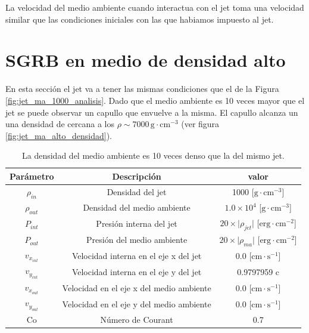 \documentclass[12pt,a4paper]{book}
\begin{document}
La velocidad del medio ambiente cuando interactua con el jet toma una velocidad similar que las condiciones iniciales con las que habiamos impuesto al jet.


\section{SGRB en medio de densidad alto}\label{sec:SGRB_en_medio_de_densidad_alto}
En esta sección el jet va a tener las mismas condiciones que el de la Figura \ref{fig:jet_ma_1000_analisis}. Dado que el medio ambiente es 10 veces mayor que el jet se puede observar un capullo que envuelve a la misma. El capullo alcanza un una densidad de cercana a los $\rho \sim 7000 \, \mathrm{g} \cdot \mathrm{cm}^{-3}$ (ver figura \ref{fig:jet_ma_alto_densidad}).

\begin{table}[htbp]
\begin{center}
\begin{tabular}{|c|c|c|}
\hline 
\textbf{Parámetro} & \textbf{Descripción} & \textbf{valor} \\ 
\hline 
$\rho_{in}$ &  Densidad del jet & 1000 [$\mathrm{g} \cdot \mathrm{cm}^{-3}$] \\ 
\hline 
$\rho_{out}$ &  Densidad del medio ambiente & $1.0 \times 10^{4}$  [$\mathrm{g} \cdot \mathrm{cm}^{-3}$] \\
\hline 
$P_{int}$ & Presión interna del jet& $20 \times \lvert \rho_{jet} \lvert$ [$ \mathrm{erg}\cdot \mathrm{cm}^{-2}$]\\ 
\hline 
$P_{out}$ &  Presión del medio ambiente & $20 \times \lvert \rho_{ma} \lvert$ [$\mathrm{erg}\cdot \mathrm{cm}^{-2}$] \\ 
\hline 
$v_{x_{int}}$ & Velocidad interna en el eje x del jet & 0.0 [$\mathrm{cm}\cdot \mathrm{s}^{-1}$]\\ 
\hline 
$v_{y_{int}}$ & Velocidad interna en el eje y del jet & 0.9797959 c \\ 
\hline 
$v_{x_{out}}$ & Velocidad en el eje x del medio ambiente & 0.0 [$\mathrm{cm}\cdot \mathrm{s}^{-1}$] \\
\hline 
$v_{y_{out}}$ & Velocidad en el eje y del medio ambiente & 0.0 [$\mathrm{cm}\cdot \mathrm{s}^{-1}$]\\ 
\hline 
Co & Número de Courant & 0.7 \\ 
\hline 
\end{tabular}
\caption{\label{Cuadro: propiedades-jet-densidad-baja} La densidad del medio ambiente es 10 veces denso que la del mismo jet.}
\end{center}
\end{table}
\end{document}
